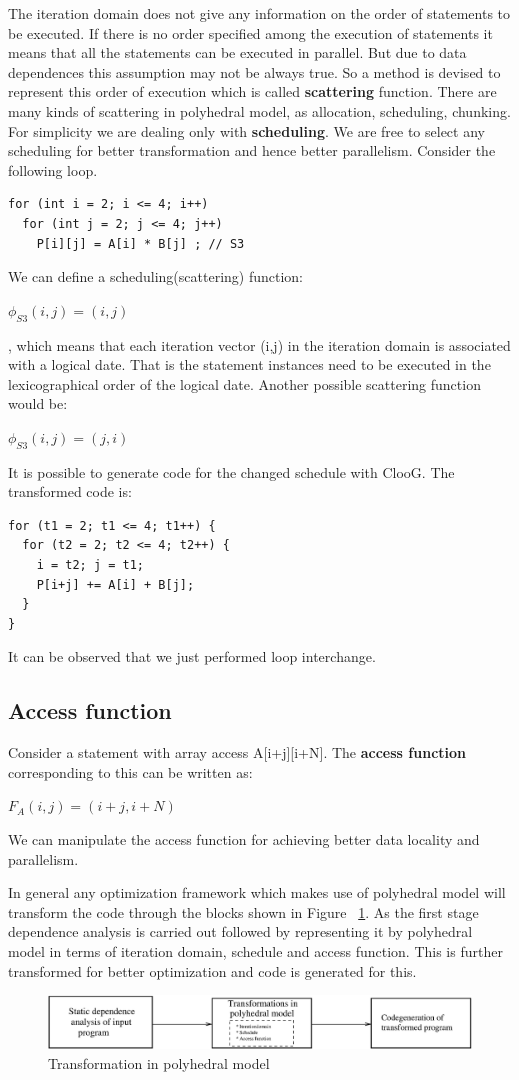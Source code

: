 The iteration domain does not give any information on the order of statements to be executed. If there
is no order specified among the execution of statements it means that all the statements can be executed
in parallel. But due to data dependences this assumption may not be always true. So a method is devised
to represent this order of execution which is called \textbf{scattering} function. There are many
kinds of scattering in polyhedral model, as allocation, scheduling, chunking. For simplicity
we are dealing only with \textbf{scheduling}. We are free to select any scheduling for better
transformation and hence better parallelism.
Consider the following loop.
{\footnotesize
\begin{lstlisting}
for (int i = 2; i <= 4; i++)
  for (int j = 2; j <= 4; j++)
    P[i][j] = A[i] * B[j] ; // S3
\end{lstlisting}
}
\noindent
We can define a scheduling(scattering) function:
\begin{center}
$\phi_{S3}(i,j) = (i,j)$
\end{center}, which means that each iteration vector (i,j) in the iteration domain is associated with
a logical date. That is the statement instances need to be executed in the lexicographical order of the
logical date. Another possible scattering function would be:
\begin{center}
$\phi_{S3}(i,j) = (j,i)$
\end{center}
\noindent
It is possible to generate code for the changed schedule with ClooG\cite{cloog}. The
transformed code is:
{\footnotesize
\begin{lstlisting}
for (t1 = 2; t1 <= 4; t1++) {
  for (t2 = 2; t2 <= 4; t2++) {
    i = t2; j = t1;
    P[i+j] += A[i] + B[j];
  }
}
\end{lstlisting}
}
\noindent
It can be observed that we just performed loop interchange.
\subsection{Access function}
Consider a statement with array access A[i+j][i+N]. The \textbf{access function} corresponding to this can be written
as:
\begin{center}
$F_A(i,j) = (i+j,i+N)$
\end{center}
We can manipulate the access function for achieving better data locality and parallelism.

In general any optimization framework which makes use of polyhedral model will
transform the code through the blocks shown in Figure ~\ref{fig:poly_steps}.
As the first stage dependence analysis is carried out followed by representing
it by polyhedral model in terms of iteration domain, schedule and access function.
This is further transformed for better optimization and code is generated
for this.
\begin{figure}
  \includegraphics[width=1\textwidth]{images/poly_steps.eps}
  \caption{Transformation in polyhedral model}
  \label{fig:poly_steps}
\end{figure}

